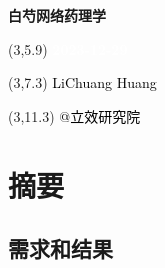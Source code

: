 \documentclass[
]{article}
\author{}
\date{\vspace{-2.5em}}
\begin{document}
\begin{titlepage} 
\begin{center} \textbf{\Huge 白芍网络药理学}
\vspace{4em} \begin{textblock}{10}(3,5.9) \huge
\textbf{\textcolor{white}{2023-12-29}}
\end{textblock} \begin{textblock}{10}(3,7.3)
\Large \textcolor{black}{LiChuang Huang}
\end{textblock} \begin{textblock}{10}(3,11.3)
\Large \textcolor{black}{@立效研究院}
\end{textblock} \end{center} \end{titlepage}
\restoregeometry


\tableofcontents

\listoffigures

\listoftables

\newpage


\hypertarget{abstract}{%
\section{摘要}\label{abstract}}

\hypertarget{ux9700ux6c42ux548cux7ed3ux679c}{%
\subsection{需求和结果}\label{ux9700ux6c42ux548cux7ed3ux679c}}
\end{document}
